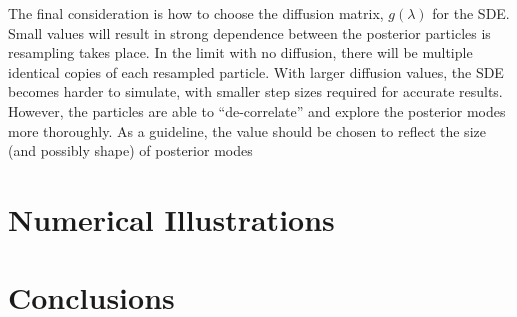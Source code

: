 \documentclass{article}
\begin{document}
The final consideration is how to choose the diffusion matrix, $g(\lambda)$ for the SDE. Small values will result in strong dependence between the posterior particles is resampling takes place. In the limit with no diffusion, there will be multiple identical copies of each resampled particle. With larger diffusion values, the SDE becomes harder to simulate, with smaller step sizes required for accurate results. However, the particles are able to ``de-correlate'' and explore the posterior modes more thoroughly. As a guideline, the value should be chosen to reflect the size (and possibly shape) of posterior modes


\section{Numerical Illustrations}



\section{Conclusions}
\end{document}
